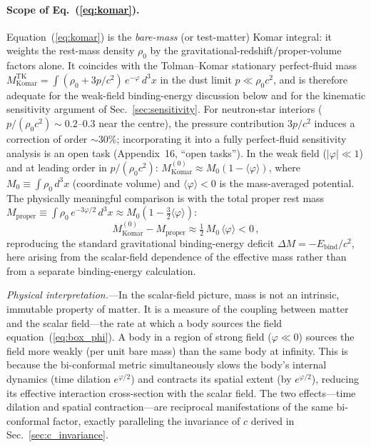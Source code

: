 \documentclass[aps,prd,onecolumn,superscriptaddress,nofootinbib,showpacs,12pt]{revtex4-2}
\begin{document}
\paragraph{Scope of Eq.~(\ref{eq:komar}).}
Equation~(\ref{eq:komar}) is the \emph{bare-mass} (or
test-matter) Komar integral: it weights the rest-mass
density $\rho_0$ by the gravitational-redshift/proper-volume
factors alone.  It coincides with the Tolman--Komar
stationary perfect-fluid mass $M_{\mathrm{Komar}}^{\mathrm{TK}}
= \int (\rho_0 + 3p/c^2)\,e^{-\varphi}\,d^3x$ in the
dust limit $p\ll\rho_0 c^2$, and is therefore adequate
for the weak-field binding-energy discussion below and
for the kinematic sensitivity argument of
Sec.~\ref{sec:sensitivity}.  For neutron-star interiors
($p/(\rho_0 c^2)\sim 0.2$--$0.3$ near the centre), the
pressure contribution $3p/c^2$ induces a correction of
order $\sim 30\%$; incorporating it into a fully
perfect-fluid sensitivity analysis is an open task
(Appendix~16, ``open tasks'').
In the weak field ($|\varphi| \ll 1$) and at leading
order in $p/(\rho_0 c^2)$:
$M_{\mathrm{Komar}}^{(0)} \approx M_{0}(1 - \langle\varphi\rangle)$,
where $M_{0} \equiv \int\rho_{0}\,d^{3}x$ (coordinate
volume) and $\langle\varphi\rangle < 0$ is the
mass-averaged potential.  The physically meaningful
comparison is with the total proper rest mass
$M_{\mathrm{proper}} \equiv \int\rho_{0}\,
e^{-3\varphi/2}\,d^{3}x \approx
M_{0}(1 - \tfrac{3}{2}\langle\varphi\rangle)$:
\begin{equation}\label{eq:binding_deficit}
  M_{\mathrm{Komar}}^{(0)} - M_{\mathrm{proper}}
  \approx \tfrac{1}{2}\,M_{0}\,\langle\varphi\rangle < 0\,,
\end{equation}
reproducing the standard gravitational binding-energy
deficit $\Delta M = -E_{\mathrm{bind}}/c^{2}$, here
arising from the scalar-field dependence of the effective
mass rather than from a separate binding-energy calculation.

\textit{Physical interpretation.}---In the scalar-field
picture, mass is not an intrinsic, immutable property
of matter.  It is a measure of the coupling between
matter and the scalar field---the rate at which a body
sources the field equation~(\ref{eq:box_phi}).  A body
in a region of strong field ($\varphi \ll 0$) sources
the field more weakly (per unit bare mass) than the
same body at infinity.  This is because the bi-conformal
metric simultaneously slows the body's internal dynamics
(time dilation $e^{\varphi/2}$) and contracts its
spatial extent (by $e^{\varphi/2}$), reducing its
effective interaction cross-section with the scalar field.
The two effects---time dilation and spatial
contraction---are reciprocal manifestations of the same
bi-conformal factor, exactly paralleling the invariance
of $c$ derived in Sec.~\ref{sec:c_invariance}.
\end{document}
